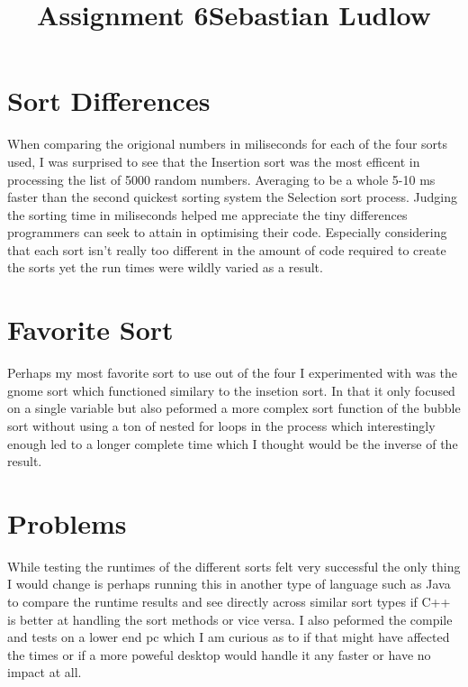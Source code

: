 \documentclass[12pt]{article}
\begin{document}
\title{Assignment 6}
\maketitle
\title{Sebastian Ludlow}
\maketitle

\section{Sort Differences}
When comparing the origional numbers in miliseconds for each of the four sorts used, I was surprised to see that the Insertion sort was the most efficent in processing the list of 5000 random numbers. Averaging to be a whole 5-10 ms faster than the second quickest sorting system the Selection sort process. Judging the sorting time in miliseconds helped me appreciate the tiny differences programmers can seek to attain in optimising their code. Especially considering that each sort isn't really too different in the amount of code required to create the sorts yet the run times were wildly varied as a result.

\section{Favorite Sort}
Perhaps my most favorite sort to use out of the four I experimented with was the gnome sort which functioned similary to the insetion sort. In that it only focused on a single variable but also peformed a more complex sort function of the bubble sort without 
using a ton of nested for loops in the process which interestingly enough led to a longer complete time which I thought would be the inverse of the result. 

\section{Problems}
While testing the runtimes of the different sorts felt very successful the only thing I would change is perhaps running this in another type of language such as Java to compare the runtime results and see directly across similar sort types if C++ is better at handling the sort methods or vice versa. I also peformed the compile and tests on a lower end pc which I am curious as to if that might have affected the times or if a more poweful desktop would handle it any faster or have no impact at all.
\end{document}
